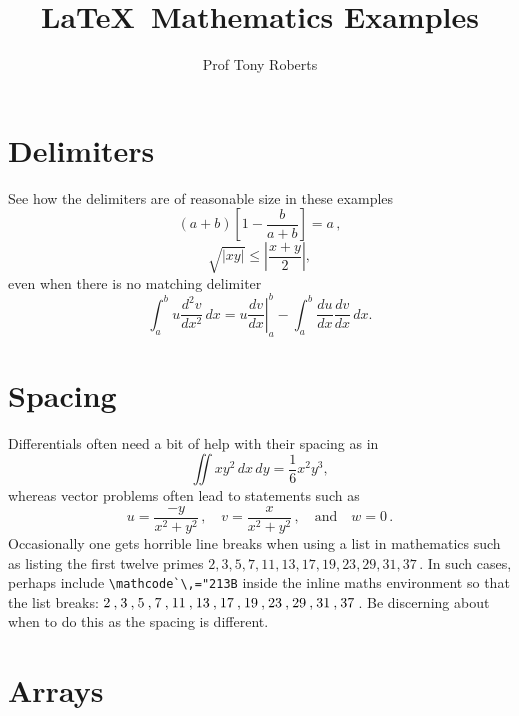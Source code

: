 \documentclass[20pt,a4paper]{extarticle}
\title{\LaTeX\ Mathematics Examples}
\author{Prof Tony Roberts}
\begin{document}
\maketitle

\tableofcontents



\section{Delimiters}

See how the delimiters are of reasonable size in these examples
\[
	\left(a+b\right)\left[1-\frac{b}{a+b}\right]=a\,,
\]
\[
	\sqrt{|xy|}\leq\left|\frac{x+y}{2}\right|,
\]
even when there is no matching delimiter
\[
	\int_a^bu\frac{d^2v}{dx^2}\,dx
	=\left.u\frac{dv}{dx}\right|_a^b
	-\int_a^b\frac{du}{dx}\frac{dv}{dx}\,dx.
\]






\section{Spacing}

Differentials often need a bit of help with their spacing as in
\[
	\iint xy^2\,dx\,dy
	=\frac{1}{6}x^2y^3,
\]
whereas vector problems often lead to statements such as
\[
	u=\frac{-y}{x^2+y^2}\,,\quad
	v=\frac{x}{x^2+y^2}\,,\quad\text{and}\quad
	w=0\,.
\]
Occasionally one gets horrible line breaks when using a list in mathematics such as listing the first twelve primes  \(2,3,5,7,11,13,17,19,23,29,31,37\)\,.
In such cases, perhaps include \verb|\mathcode`\,="213B| inside the inline maths environment so that the list breaks: \(\mathcode`\,="213B 2,3,5,7,11,13,17,19,23,29,31,37\)\,.
Be discerning about when to do this as the spacing is different.






\section{Arrays}
\end{document}
